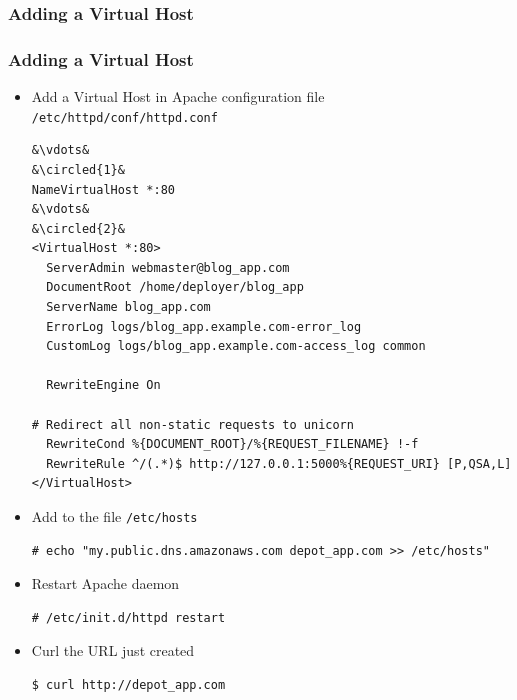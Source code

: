 \documentclass{beamer}
\newcommand*\circled[1]{\tikz[baseline=(char.base)]{
            \node[shape=circle,draw,inner sep=2pt] (char) {#1};}}
\begin{document}
\subsubsection{Adding a Virtual Host}
\begin{frame}
\frametitle{Adding a Virtual Host}
\begin{itemize}
 \item  Add a Virtual Host in Apache configuration file \texttt{/etc/httpd/conf/httpd.conf}

\lstset{language=shell, escapechar=&, numbers=left}
\begin{lstlisting}
&\vdots&
&\circled{1}&
NameVirtualHost *:80
&\vdots&
&\circled{2}&
<VirtualHost *:80>
  ServerAdmin webmaster@blog_app.com
  DocumentRoot /home/deployer/blog_app
  ServerName blog_app.com
  ErrorLog logs/blog_app.example.com-error_log
  CustomLog logs/blog_app.example.com-access_log common

  RewriteEngine On

# Redirect all non-static requests to unicorn
  RewriteCond %{DOCUMENT_ROOT}/%{REQUEST_FILENAME} !-f 
  RewriteRule ^/(.*)$ http://127.0.0.1:5000%{REQUEST_URI} [P,QSA,L]
</VirtualHost>
\end{lstlisting}

\item Add to the file \texttt{/etc/hosts}
\lstset{language=shell, escapechar=&}
\begin{lstlisting}
# echo "my.public.dns.amazonaws.com depot_app.com >> /etc/hosts" 
\end{lstlisting}

\item Restart Apache daemon

\lstset{language=shell, escapechar=!}
\begin{lstlisting}[escapechar=!]
# /etc/init.d/httpd restart
\end{lstlisting}

\item Curl the URL just created

\begin{lstlisting}[escapechar=!]
$ curl http://depot_app.com
\end{lstlisting} 

\end{itemize}

\end{frame}

\end{document}
